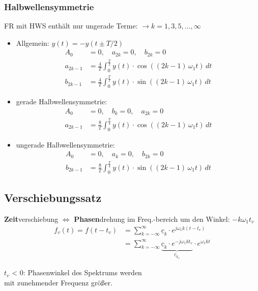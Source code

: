 \subsubsection{Halbwellensymmetrie}
{\small FR mit HWS enthält nur ungerade Terme: $\rightarrow k=1,3,5,\dots,\infty$}
\begin{itemize}
	
	\item Allgemein: $y(t) = -y(t \pm T/2)$
	\begin{align*}
		A_0 &= 0,\quad
		a_{2k} = 0,\quad
		b_{2k} = 0\\
		a_{2k-1} &= \frac{4}{T}\int^{\frac{T}{2}}_{0}y(t)\cdot \cos((2k-1)\,\omega_1t)\,dt\\
		b_{2k-1} &= \frac{4}{T}\int^{\frac{T}{2}}_{0}y(t)\cdot \sin((2k-1)\,\omega_1t)\,dt
	\end{align*}
	
	\item gerade Halbwellensymmetrie:
		\begin{align*}
		A_0 &= 0,\quad
		b_k = 0,\quad
		a_{2k} = 0\\
		a_{2k-1} &= \frac{8}{T}\int^{\frac{T}{4}}_{0}y(t)\cdot \cos((2k-1)\,\omega_1t)\,dt
	\end{align*}
	
		\item ungerade Halbwellensymmetrie:
	\begin{align*}
	A_0 &= 0,\quad
	a_k = 0,\quad
	b_{2k} = 0\\
	b_{2k-1} &= \frac{8}{T}\int^{\frac{T}{4}}_{0}y(t)\cdot \sin((2k-1)\,\omega_1t)\,dt
	\end{align*}
\end{itemize}

\subsection{Verschiebungssatz}
\textbf{Zeit}verschiebung $\Leftrightarrow$ \textbf{Phasen}drehung im Freq.-bereich um den Winkel: $-k\omega_1 t_v$
\begin{align*}
	f_v(t) = f(t-t_v) & = \sum_{k=-\infty}^{\infty} \underline{c}_k\cdot e^{j\omega_1 k (t-t_v)}                                                       \\
	                  & = \sum_{k=-\infty}^{\infty} \underbrace{\underline{c}_k\cdot e^{-j\omega_1 k t_v}}_{\underline{c}_{k_v}} \cdot e^{\omega_1 k t}
\end{align*}

$t_v$ < 0: Phasenwinkel des Spektrums werden\\ mit
zunehmender Frequenz größer.

